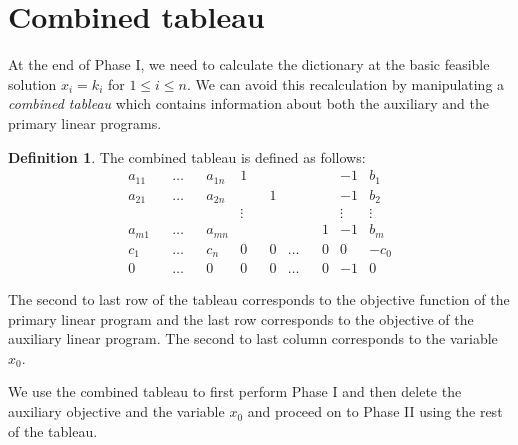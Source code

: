 \documentclass[
]{book}
\theoremstyle{definition}
\newtheorem{definition}{Definition}[chapter]
\theoremstyle{definition}
\theoremstyle{definition}
\theoremstyle{definition}
\theoremstyle{remark}
\begin{document}
\hypertarget{combined-tableau}{%
\section{Combined tableau}\label{combined-tableau}}

At the end of Phase I, we need to calculate the dictionary at the basic feasible solution \(x_i = k_i\) for \(1 \le i \le n\). We can avoid this recalculation by manipulating a \emph{combined tableau} which contains information about both the auxiliary and the primary linear programs.

\begin{definition}
The combined tableau is defined as follows:
\begin{equation*}
  \begin{array}{rrrrrrrrrrrr|l}
      a_{11}  & & \dots & & a_{1n}  & 1 & & & & & & -1 &b_1\\
      a_{21}  & & \dots & & a_{2n}  & & & 1 & & & & -1 &b_2\\
      & & & & & \vdots & & & & & & \vdots & \vdots \\
      a_{m1}  & & \dots & & a_{mn}  & & & & & & 1 & -1 &b_m\\ \hline
      c_1  & & \dots & & c_{n}  & 0 & & 0 & \dots & & 0 & 0 & -c_0\\ \hline
      0  & & \dots & & 0  & 0 & & 0 & \dots & & 0 & -1 & 0
  \end{array} 
\end{equation*}
\end{definition}

The second to last row of the tableau corresponds to the objective function of the primary linear program and the last row corresponds to the objective of the auxiliary linear program. The second to last column corresponds to the variable \(x_0\).

We use the combined tableau to first perform Phase I and then delete the auxiliary objective and the variable \(x_0\) and proceed on to Phase II using the rest of the tableau.
\end{document}
